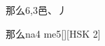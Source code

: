 \begin{entry}{那么}{6,3}{⾢、⼃}
  \begin{phonetics}{那么}{na4 me5}[][HSK 2]
  \end{phonetics}
\end{entry}
